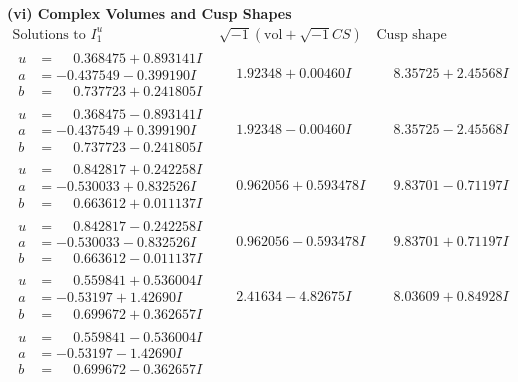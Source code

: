 \documentclass[1p]{elsarticle_modified}
\theoremstyle{definition}
\newcommand{\I}{\sqrt{-1}}
\begin{document}
\newpage\flushleft \textbf{(vi) Complex Volumes and Cusp Shapes}
$$\begin{array}{c|c|c}  
\text{Solutions to }I^u_{1}& \I (\text{vol} + \sqrt{-1}CS) & \text{Cusp shape}\\
 \hline 
\begin{aligned}
u &= \phantom{-}0.368475 + 0.893141 I \\
a &= -0.437549 - 0.399190 I \\
b &= \phantom{-}0.737723 + 0.241805 I\end{aligned}
 & \phantom{-}1.92348 + 0.00460 I & \phantom{-}8.35725 + 2.45568 I \\ \hline\begin{aligned}
u &= \phantom{-}0.368475 - 0.893141 I \\
a &= -0.437549 + 0.399190 I \\
b &= \phantom{-}0.737723 - 0.241805 I\end{aligned}
 & \phantom{-}1.92348 - 0.00460 I & \phantom{-}8.35725 - 2.45568 I \\ \hline\begin{aligned}
u &= \phantom{-}0.842817 + 0.242258 I \\
a &= -0.530033 + 0.832526 I \\
b &= \phantom{-}0.663612 + 0.011137 I\end{aligned}
 & \phantom{-}0.962056 + 0.593478 I & \phantom{-}9.83701 - 0.71197 I \\ \hline\begin{aligned}
u &= \phantom{-}0.842817 - 0.242258 I \\
a &= -0.530033 - 0.832526 I \\
b &= \phantom{-}0.663612 - 0.011137 I\end{aligned}
 & \phantom{-}0.962056 - 0.593478 I & \phantom{-}9.83701 + 0.71197 I \\ \hline\begin{aligned}
u &= \phantom{-}0.559841 + 0.536004 I \\
a &= -0.53197 + 1.42690 I \\
b &= \phantom{-}0.699672 + 0.362657 I\end{aligned}
 & \phantom{-}2.41634 - 4.82675 I & \phantom{-}8.03609 + 0.84928 I \\ \hline\begin{aligned}
u &= \phantom{-}0.559841 - 0.536004 I \\
a &= -0.53197 - 1.42690 I \\
b &= \phantom{-}0.699672 - 0.362657 I\end{aligned}

\end{array}$$
\end{document}
